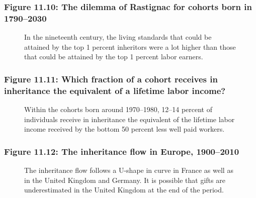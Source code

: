 \documentclass[t]{beamer}\usepackage[]{graphicx}\usepackage[]{color}
\begin{document}
\begin{frame}[label=Figure_11_10]
\frametitle{Figure 11.10: The dilemma of Rastignac for cohorts born in 1790--2030}
\begin{figure}[t]
\begin{minipage}[b]{\textwidth}
\centering

\caption{In the nineteenth century, the living standards that could be attained by the top 1 percent inheritors were a lot higher than those that could be attained by the top 1 percent labor earners.}
\end{minipage}
\end{figure}
\end{frame}


\begin{frame}[label=Figure_11_11]
\frametitle{Figure 11.11: Which fraction of a cohort receives in inheritance the equivalent of a lifetime labor income?}
\begin{figure}[t]
\begin{minipage}[b]{\textwidth}
\centering

\caption{Within the cohorts born around 1970--1980, 12--14 percent of individuals receive in inheritance the equivalent of the lifetime labor income received by the bottom 50 percent less well paid workers.}
\end{minipage}
\end{figure}
\end{frame}


\begin{frame}[label=Figure_11_12]
\frametitle{Figure 11.12: The inheritance flow in Europe, 1900--2010}
\begin{figure}[t]
\begin{minipage}[b]{\textwidth}
\centering

\caption{The inheritance flow follows a U-shape in curve in France as well as in the United Kingdom and Germany. It is possible that gifts are underestimated in the United Kingdom at the end of the period.}
\end{minipage}
\end{figure}
\end{frame}
\end{document}
